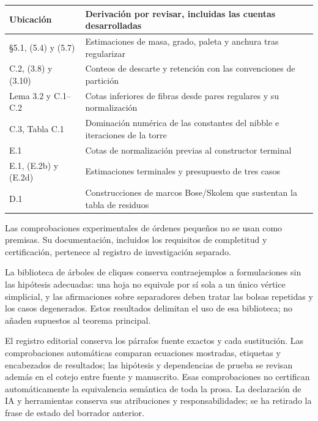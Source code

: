 \documentclass[spanish,11pt,a4paper]{article}
\newcounter{none}
\begin{document}
{\def\LTcaptype{none} %
\begin{longtable}[]{@{}
  >{\raggedright\arraybackslash}p{}
  >{\raggedright\arraybackslash}p{}@{}}
\toprule\noalign{}
\begin{minipage}[b]{\linewidth}\raggedright
Ubicación
\end{minipage} & \begin{minipage}[b]{\linewidth}\raggedright
Derivación por revisar, incluidas las cuentas desarrolladas
\end{minipage} \\
\midrule\noalign{}
\endhead
\bottomrule\noalign{}
\endlastfoot
§5.1, (5.4) y (5.7) & Estimaciones de masa, grado, paleta y anchura tras
regularizar \\
C.2, (3.8) y (3.10) & Conteos de descarte y retención con las
convenciones de partición \\
Lema 3.2 y C.1--C.2 & Cotas inferiores de fibras desde pares regulares y
su normalización \\
C.3, Tabla C.1 & Dominación numérica de las constantes del nibble e
iteraciones de la torre \\
E.1 & Cotas de normalización previas al constructor terminal \\
E.1, (E.2b) y (E.2d) & Estimaciones terminales y presupuesto de tres
casos \\
D.1 & Construcciones de marcos Bose/Skolem que sustentan la tabla de
residuos \\
\end{longtable}
}

Las comprobaciones experimentales de órdenes pequeños no se usan como
premisas. Su documentación, incluidos los requisitos de completitud y
certificación, pertenece al registro de investigación separado.

La biblioteca de árboles de cliques conserva contraejemplos a
formulaciones sin las hipótesis adecuadas: una hoja no equivale por sí
sola a un único vértice simplicial, y las afirmaciones sobre separadores
deben tratar las bolsas repetidas y los casos degenerados. Estos
resultados delimitan el uso de esa biblioteca; no añaden supuestos al
teorema principal.

El registro editorial conserva los párrafos fuente exactos y cada
sustitución. Las comprobaciones automáticas comparan ecuaciones
mostradas, etiquetas y encabezados de resultados; las hipótesis y
dependencias de prueba se revisan además en el cotejo entre fuente y
manuscrito. Esas comprobaciones no certifican automáticamente la
equivalencia semántica de toda la prosa. La declaración de IA y
herramientas conserva sus atribuciones y responsabilidades; se ha
retirado la frase de estado del borrador anterior.
\end{document}
